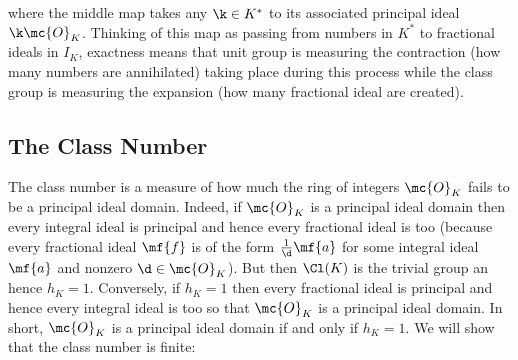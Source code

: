     \begin{center}
    \end{center}

    where the middle map takes any $\k \in K^{\ast}$ to its associated principal ideal $\k\mc{O}_{K}$. Thinking of this map as passing from numbers in $K^{\ast}$ to fractional ideals in $I_{K}$, exactness means that unit group is measuring the contraction (how many numbers are annihilated) taking place during this process while the class group is measuring the expansion (how many fractional ideal are created).
  \subsection*{The Class Number}
    The class number is a measure of how much the ring of integers $\mc{O}_{K}$ fails to be a principal ideal domain. Indeed, if $\mc{O}_{K}$ is a principal ideal domain then every integral ideal is principal and hence every fractional ideal is too (because every fractional ideal $\mf{f}$ is of the form $\frac{1}{\d}\mf{a}$ for some integral ideal $\mf{a}$ and nonzero $\d \in \mc{O}_{K}$). But then $\Cl(K)$ is the trivial group an hence $h_{K} = 1$. Conversely, if $h_{K} = 1$ then every fractional ideal is principal and hence every integral ideal is too so that $\mc{O}_{K}$ is a principal ideal domain. In short, $\mc{O}_{K}$ is a principal ideal domain if and only if $h_{K} = 1$. We will show that the class number is finite:

